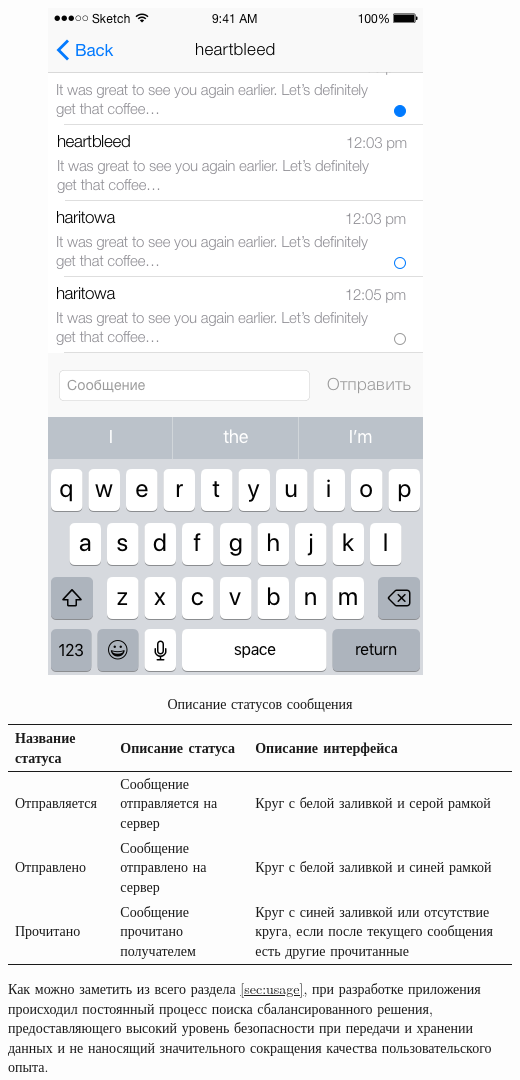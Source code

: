 \begin{figure}[H]
\begin{minipage}{.5\textwidth}
  \includegraphics[height=0.25\textheight]{inc/img/ui/single_dialogue.png}
  \label{sec:usage:dialogues:single}
\end{minipage}
\end{figure}

\begin{table}[!ht]
  \caption{Описание статусов сообщения}
  \label{table:usage:dialogues:statusdesc}
  \centering
  \begin{tabularx}{\linewidth}{
    |>{\centering\hsize=0.75\hsize}X|
    >{\centering\hsize=1\hsize}X|
    >{\centering\arraybackslash\hsize=1.25\hsize}X|
  }
	\hline
	Название статуса & Описание статуса & Описание интерфейса \\

	\hline
	Отправляется & Сообщение отправляется на сервер & Круг с белой заливкой и серой рамкой \\

	\hline
	Отправлено & Сообщение отправлено на сервер & Круг с белой заливкой и синей рамкой \\

	\hline
	Прочитано & Сообщение прочитано получателем & Круг с синей заливкой или отсутствие круга, если после текущего сообщения есть другие прочитанные \\

	\hline
  \end{tabularx}
\end{table}

Как можно заметить из всего раздела \ref{sec:usage}, при разработке приложения происходил постоянный процесс поиска сбалансированного решения, предоставляющего высокий уровень безопасности при передачи и хранении данных и не наносящий значительного сокращения качества пользовательского опыта.